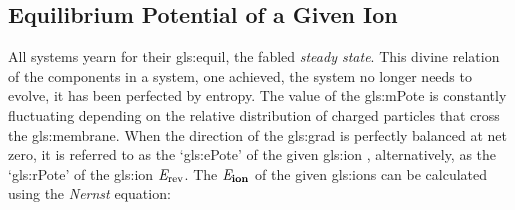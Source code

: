 \documentclass[class={myRUCProject}, crop=false]{standalone}
\begin{document}
\subsection{Equilibrium Potential of a Given Ion}
\begingroup
\allowdisplaybreaks
All systems yearn for their \gls{gls:equil}, the fabled \textit{steady state}. This divine relation of the components in a system, one achieved, the system no longer needs to evolve, it has been perfected by entropy. 
The value of the \gls{gls:mPote} is constantly fluctuating depending on the relative distribution of charged particles that cross the \gls{gls:membrane}. 
When the direction of the \gls{gls:grad} is perfectly balanced at net zero, it is referred to as the `\gls{gls:ePote}' of the given \gls{gls:ion} \br{\equi\ion}, alternatively, as the `\gls{gls:rPote}' of the \gls{gls:ion} \(\mathit{E}_\mathrm{rev}\). 
The \(\mathit{E}_\mathbf{ion}\) of the given \glspl{gls:ion} can be calculated using the \textit{Nernst} equation:
\end{document}
